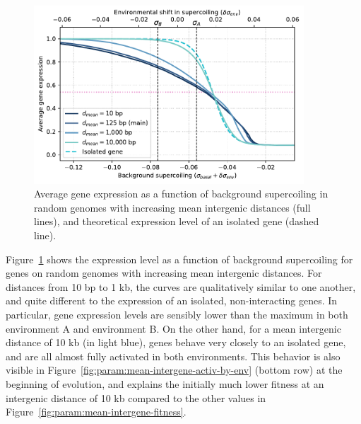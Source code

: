 \begin{figure}[H]
\centering
\includegraphics[width=0.9\textwidth]{param/mean-intergene/random_activ_per_sigma.pdf}
\caption[Average gene expression as a function of background supercoiling, with increasing mean intergenic distances, in random genomes]{Average gene expression as a function of background supercoiling in random genomes with increasing mean intergenic distances (full lines), and theoretical expression level of an isolated gene (dashed line).}
\label{fig:param:mean-intergene-random-activ-by-sigma}
\end{figure}

Figure~\ref{fig:param:mean-intergene-random-activ-by-sigma} shows the expression level as a function of background supercoiling for genes on random genomes with increasing mean intergenic distances.
For distances from 10 bp to 1 kb, the curves are qualitatively similar to one another, and quite different to the expression of an isolated, non-interacting genes.
In particular, gene expression levels are sensibly lower than the maximum in both environment A and environment B.
On the other hand, for a mean intergenic distance of 10 kb (in light blue), genes behave very closely to an isolated gene, and are all almost fully activated in both environments.
This behavior is also visible in Figure~\ref{fig:param:mean-intergene-activ-by-env} (bottom row) at the beginning of evolution, and explains the initially much lower fitness at an intergenic distance of 10 kb compared to the other values in Figure~\ref{fig:param:mean-intergene-fitness}.

